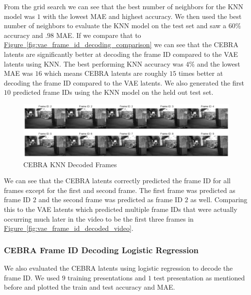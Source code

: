 \documentclass[12pt, letterpaper]{article}
\begin{document}
From the grid search we can see that the best number of neighbors for the KNN model was $1$ with the lowest MAE and highest accuracy. We then used the best number of neighbors to evaluate the KNN model on the test set and saw a $60\%$ accuracy and $.98$ MAE. If we compare that to \hyperref[fig:vae_frame_id_decoding_comparison]{Figure~\ref{fig:vae_frame_id_decoding_comparison}} we can see that the CEBRA \cite{schneider2023} latents are significantly better at decoding the frame ID compared to the VAE latents using KNN. The best performing KNN accuracy was $4\%$ and the lowest MAE was $16$ which means CEBRA \cite{schneider2023} latents are roughly $15$ times better at decoding the frame ID compared to the VAE latents. We also generated the first $10$ predicted frame IDs using the KNN model on the held out test set.

\begin{figure}[H]
    \centering
    \includegraphics[width=1.0\textwidth]{cebra_knn_video.png}
    \caption{CEBRA KNN Decoded Frames}
    \label{fig:cebra_knn_frame_id_decoded_video}
\end{figure}

We can see that the CEBRA \cite{schneider2023} latents correctly predicted the frame ID for all frames except for the first and second frame. The first frame was predicted as frame ID $2$ and the second frame was predicted as frame ID $2$ as well. Comparing this to the VAE latents which predicted multiple frame IDs that were actually occurring much later in the video to be the first three frames in \hyperref[fig:vae_frame_id_decoded_video]{Figure~\ref{fig:vae_frame_id_decoded_video}}. 

\subsubsection{CEBRA Frame ID Decoding Logistic Regression}
\label{subsubsec:cebra_frame_id_decoding_logistic}
We also evaluated the CEBRA \cite{schneider2023} latents using logistic regression to decode the frame ID. We used $9$ training presentations and $1$ test presentation as mentioned before and plotted the train and test accuracy and MAE.
\end{document}
